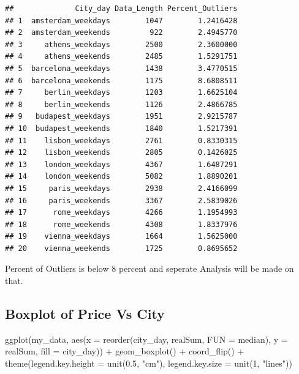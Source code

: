 \documentclass[
]{article}
\newenvironment{Shaded}{\begin{snugshade}}{\end{snugshade}}
\newcommand{\AttributeTok}[1]{\textcolor[rgb]{0.77,0.63,0.00}{#1}}
\newcommand{\DecValTok}[1]{\textcolor[rgb]{0.00,0.00,0.81}{#1}}
\newcommand{\FloatTok}[1]{\textcolor[rgb]{0.00,0.00,0.81}{#1}}
\newcommand{\FunctionTok}[1]{\textcolor[rgb]{0.00,0.00,0.00}{#1}}
\newcommand{\NormalTok}[1]{#1}
\newcommand{\SpecialCharTok}[1]{\textcolor[rgb]{0.00,0.00,0.00}{#1}}
\newcommand{\StringTok}[1]{\textcolor[rgb]{0.31,0.60,0.02}{#1}}
\begin{document}
\begin{verbatim}
##              City_day Data_Length Percent_Outliers
## 1  amsterdam_weekdays        1047        1.2416428
## 2  amsterdam_weekends         922        2.4945770
## 3     athens_weekdays        2500        2.3600000
## 4     athens_weekends        2485        1.5291751
## 5  barcelona_weekdays        1438        3.4770515
## 6  barcelona_weekends        1175        8.6808511
## 7     berlin_weekdays        1203        1.6625104
## 8     berlin_weekends        1126        2.4866785
## 9   budapest_weekdays        1951        2.9215787
## 10  budapest_weekends        1840        1.5217391
## 11    lisbon_weekdays        2761        0.8330315
## 12    lisbon_weekends        2805        0.1426025
## 13    london_weekdays        4367        1.6487291
## 14    london_weekends        5082        1.8890201
## 15     paris_weekdays        2938        2.4166099
## 16     paris_weekends        3367        2.5839026
## 17      rome_weekdays        4266        1.1954993
## 18      rome_weekends        4308        1.8337976
## 19    vienna_weekdays        1664        1.5625000
## 20    vienna_weekends        1725        0.8695652
\end{verbatim}

Percent of Outliers is below 8 percent and seperate Analysis will be
made on that.

\hypertarget{boxplot-of-price-vs-city}{%
\subsection{Boxplot of Price Vs City}\label{boxplot-of-price-vs-city}}

\begin{Shaded}
\begin{Highlighting}[]
\FunctionTok{ggplot}\NormalTok{(my\_data, }\FunctionTok{aes}\NormalTok{(}\AttributeTok{x =} \FunctionTok{reorder}\NormalTok{(city\_day, realSum, }\AttributeTok{FUN =}\NormalTok{ median),}
    \AttributeTok{y =}\NormalTok{ realSum, }\AttributeTok{fill =}\NormalTok{ city\_day)) }\SpecialCharTok{+} \FunctionTok{geom\_boxplot}\NormalTok{() }\SpecialCharTok{+} \FunctionTok{coord\_flip}\NormalTok{() }\SpecialCharTok{+}
    \FunctionTok{theme}\NormalTok{(}\AttributeTok{legend.key.height =} \FunctionTok{unit}\NormalTok{(}\FloatTok{0.5}\NormalTok{, }\StringTok{"cm"}\NormalTok{), }\AttributeTok{legend.key.size =} \FunctionTok{unit}\NormalTok{(}\DecValTok{1}\NormalTok{,}
        \StringTok{"lines"}\NormalTok{))}
\end{Highlighting}
\end{Shaded}
\end{document}

